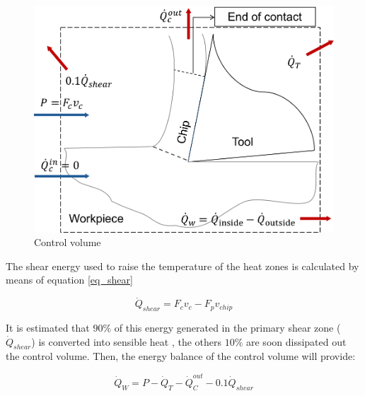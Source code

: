 		\begin{figure}[H]
			\centering
			\captionsetup{justification=centering}
			\includegraphics[scale=0.6]{Imagens/volumeControl.png}
			\caption{Control volume}
			\label{fig:volControl}
		\end{figure}

		The shear energy used to raise the temperature of the heat zones is calculated by means of equation \ref{eq_shear}

		\begin{equation} 
		\label{eq_shear}
		\dot{Q}_{shear} = F_{c}v_{c} - F_{p}v_{chip}
		\end{equation}

		It is estimated that $90\%$ of this energy generated in the primary shear zone ($\dot{Q}_{shear}$) is converted into sensible heat \cite{trigger1942}, the others $10\%$ are soon dissipated out the control volume. Then, the energy balance of the control volume will provide:

		\begin{equation} 
		\label{eq_energybalance}
		\dot{Q}_{W} = P - \dot{Q}_{T} - \dot{Q}_{C}^{out} - 0.1\dot{Q}_{shear}
		\end{equation}
